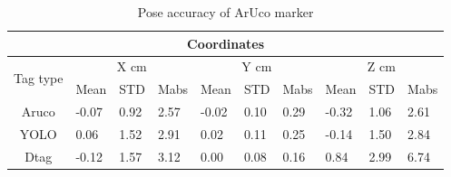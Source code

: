 \documentclass[12pt, twoside]{report}
\begin{document}
\begin{table}[]
    \centering
    \begin{tabular}{|clllllllll|}
        \hline
        \multicolumn{10}{|c|}{Coordinates}                                                                                                                                                                                                                                                        \\ \hline
        \multicolumn{1}{|c|}{\multirow{2}{*}{Tag type}} & \multicolumn{3}{c|}{X cm}  & \multicolumn{3}{c|}{Y cm} & \multicolumn{3}{c|}{Z cm}                                                                                                                                                      \\ \cline{2-10}
        \multicolumn{1}{|c|}{}                          & \multicolumn{1}{l|}{Mean}  & \multicolumn{1}{l|}{STD}  & \multicolumn{1}{l|}{Mabs} & \multicolumn{1}{l|}{Mean}  & \multicolumn{1}{l|}{STD}  & \multicolumn{1}{l|}{Mabs} & \multicolumn{1}{l|}{Mean}  & \multicolumn{1}{l|}{STD}  & Mabs \\ \hline
        \multicolumn{1}{|c|}{Aruco}                     & \multicolumn{1}{l|}{-0.07} & \multicolumn{1}{l|}{0.92} & \multicolumn{1}{l|}{2.57} & \multicolumn{1}{l|}{-0.02} & \multicolumn{1}{l|}{0.10} & \multicolumn{1}{l|}{0.29} & \multicolumn{1}{l|}{-0.32} & \multicolumn{1}{l|}{1.06} & 2.61 \\ \hline
        \multicolumn{1}{|c|}{YOLO}                      & \multicolumn{1}{l|}{0.06}  & \multicolumn{1}{l|}{1.52} & \multicolumn{1}{l|}{2.91} & \multicolumn{1}{l|}{0.02}  & \multicolumn{1}{l|}{0.11} & \multicolumn{1}{l|}{0.25} & \multicolumn{1}{l|}{-0.14} & \multicolumn{1}{l|}{1.50} & 2.84 \\ \hline
        \multicolumn{1}{|c|}{Dtag}                      & \multicolumn{1}{l|}{-0.12} & \multicolumn{1}{l|}{1.57} & \multicolumn{1}{l|}{3.12} & \multicolumn{1}{l|}{0.00}  & \multicolumn{1}{l|}{0.08} & \multicolumn{1}{l|}{0.16} & \multicolumn{1}{l|}{0.84}  & \multicolumn{1}{l|}{2.99} & 6.74 \\ \hline
    \end{tabular}
    \caption{Pose accuracy of ArUco marker}
    \label{tab:pose_accuracy}

\end{table}
\end{document}
